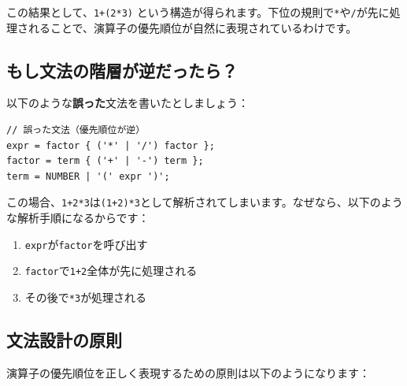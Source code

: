 この結果として、\texttt{1+(2*3)}
という構造が得られます。下位の規則で\texttt{*}や\texttt{/}が先に処理されることで、演算子の優先順位が自然に表現されているわけです。

\begin{center}
\end{center}

\hypertarget{chapter2-ux3082ux3057ux6587ux6cd5ux306eux968eux5c64ux304cux9006ux3060ux3063ux305fux3089}{%
\subsection{もし文法の階層が逆だったら？}\label{chapter2-ux3082ux3057ux6587ux6cd5ux306eux968eux5c64ux304cux9006ux3060ux3063ux305fux3089}}

以下のような\textbf{誤った}文法を書いたとしましょう：

\begin{verbatim}
// 誤った文法（優先順位が逆）
expr = factor { ('*' | '/') factor };
factor = term { ('+' | '-') term };
term = NUMBER | '(' expr ')';
\end{verbatim}

この場合、\texttt{1+2*3}は\texttt{(1+2)*3}として解析されてしまいます。なぜなら、以下のような解析手順になるからです：

\begin{enumerate}
\def\labelenumi{\arabic{enumi}.}
\tightlist
\item
 \texttt{expr}が\texttt{factor}を呼び出す
\item
  \texttt{factor}で\texttt{1+2}全体が先に処理される
\item
  その後で\texttt{*3}が処理される
\end{enumerate}

\hypertarget{chapter2-ux6587ux6cd5ux8a2dux8a08ux306eux539fux5247}{%
\subsection{文法設計の原則}\label{chapter2-ux6587ux6cd5ux8a2dux8a08ux306eux539fux5247}}

演算子の優先順位を正しく表現するための原則は以下のようになります：

